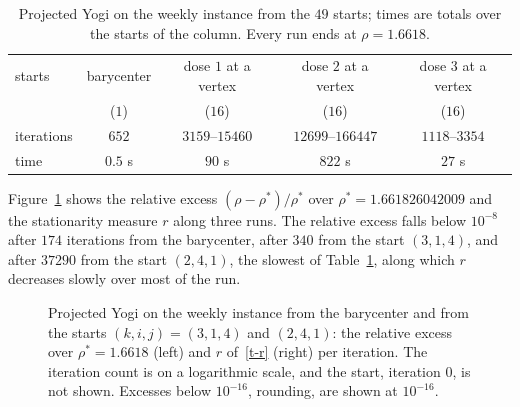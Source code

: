 \documentclass[11pt]{article}
\theoremstyle{plain}
\theoremstyle{definition}
\theoremstyle{remark}
\numberwithin{equation}{section}
\numberwithin{figure}{section}
\numberwithin{table}{section}
\begin{document}
\begin{table}[ht]
\centering
\small
\begin{tabular}{lcccc}
\hline
starts & barycenter & dose $1$ at a vertex & dose $2$ at a vertex & dose $3$ at a vertex\\
 & ($1$) & ($16$) & ($16$) & ($16$)\\
\hline
iterations & $652$ & $3159$--$15460$ & $12699$--$166447$ & $1118$--$3354$\\
time & $0.5$ s & $90$ s & $822$ s & $27$ s\\
\hline
\end{tabular}
\caption{Projected Yogi on the weekly instance from the $49$
starts; times are totals over the starts of the column. Every run ends at
$\rho=1.6618$.}\label{t-tab-yogi}
\end{table}

Figure~\ref{t-fig-conv} shows the relative excess $(\rho-\rho^*)/\rho^*$ over
$\rho^*=1.661826042009$ and the stationarity measure $r$ along three runs. The
relative excess falls below $10^{-8}$ after $174$ iterations from the
barycenter, after $340$ from the start $(3,1,4)$, and after $37290$ from the
start $(2,4,1)$, the slowest of Table~\ref{t-tab-yogi}, along which $r$
decreases slowly over most of the run.

\begin{figure}[ht]
\centering
{}
\caption{Projected Yogi on the weekly instance from the barycenter
and from the starts $(k,i,j)=(3,1,4)$ and $(2,4,1)$: the relative excess over
$\rho^*=1.6618$ (left) and $r$ of~\eqref{t-r} (right) per iteration.
The iteration count is on a logarithmic scale, and the start, iteration $0$,
is not shown. Excesses below $10^{-16}$, rounding, are shown at
$10^{-16}$.}\label{t-fig-conv}
\end{figure}
\end{document}
